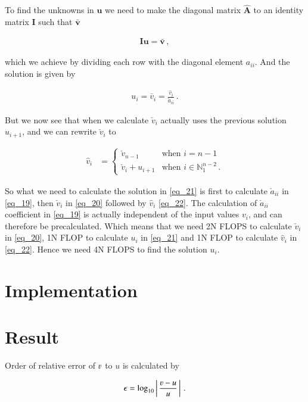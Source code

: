 \documentclass[11pt,english,a4paper]{article}
\begin{document}
\begin{flushleft}
To find the unknowns in $\textbf{u}$ we need to make the diagonal matrix $\hat{\textbf{A}}$ to an identity matrix $\textbf{I}$ such that $\bar{\textbf{v}}$

\begin{align*}
\textbf{I}\textbf{u} = \bar{\textbf{v}}\,,
\end{align*}

which we achieve by dividing each row with the diagonal element $a_{ii}$. And the solution is given by

\begin{align}
u_i = \bar{v}_i = \frac{\hat{v}_i}{\check{a}_{ii}} \,.
\label{eq_21}
\end{align}

But we now see that when we calculate $\check{v}_i$ actually uses the previous solution $u_{i+1}$, and we can rewrite $\check{v}_i$ to

\begin{align}
\hat{v}_i &= \begin{cases} \check{v}_{n-1} & \text{when $i=n-1$} \\ \check{v}_i + u_{i+1} & \text{when $i\in\mathbb{N}_1^{n-2}$}\,. \end{cases}
\label{eq_22}
\end{align}

So what we need to calculate the solution in \eqref{eq_21} is first to calculate $\check{a}_{ii}$ in \eqref{eq_19}, then $\check{v}_i$ in \eqref{eq_20} followed by $\hat{v}_i$ \eqref{eq_22}. The calculation of $\check{a}_{ii}$ coefficient in \eqref{eq_19} is actually independent of the input values $v_i$, and can therefore be precalculated. Which means that we need 2N FLOPS to calculate $\check{v}_i$ in \eqref{eq_20}, 1N FLOP to calculate $u_i$ in \eqref{eq_21} and 1N FLOP to calculate $\hat{v}_i$ in \eqref{eq_22}. Hence we need 4N FLOPS to find the solution $u_i$.

\section{Implementation}

\section{Result}

Order of relative error of $\varv$ to $u$ is calculated by

\begin{align*}
\epsilon = \log_{10}\abs{\frac{\varv - u}{u}} \,.
\end{align*}


\end{flushleft}
\end{document}
